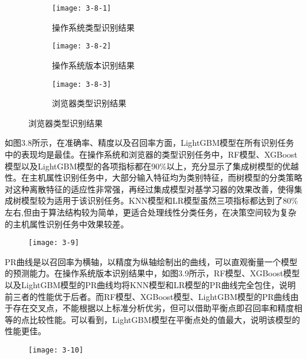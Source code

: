 \begin{figure}[!h]
    \centering
    \begin{subfigure}[b]{0.8\textwidth}
      \texttt{[image: 3-8-1]}
      \caption{操作系统类型识别结果}
    \end{subfigure}
    \begin{subfigure}[b]{0.8\textwidth}
      \texttt{[image: 3-8-2]}
      \caption{操作系统版本识别结果}
    \end{subfigure}
    \begin{subfigure}[b]{0.8\textwidth}
      \texttt{[image: 3-8-3]}
      \caption{浏览器类型识别结果}
    \end{subfigure}
    \label{fig:3-8}
\end{figure}

如图3.8所示，在准确率、精度以及召回率方面，LightGBM模型在所有识别任务中的表现均是最佳。在操作系统和浏览器的类型识别任务中，RF模型、XGBoost模型以及LightGBM模型的各项指标都在90\%以上，充分显示了集成树模型的优越性。在主机属性识别任务中，大部分输入特征均为类别特征，而树模型的分类策略对这种离散特征的适应性非常强，再经过集成模型对基学习器的效果改善，使得集成树模型较为适用于该识别任务。KNN模型和LR模型虽然三项指标都达到了80\%左右,但由于算法结构较为简单，更适合处理线性分类任务，在决策空间较为复杂的主机属性识别任务中效果较差。

\begin{figure}[!h]
    \centering
    \texttt{[image: 3-9]}
    \label{fig:3-9}
\end{figure}

PR曲线是以召回率为横轴，以精度为纵轴绘制出的曲线，可以直观衡量一个模型的预测能力。在操作系统版本识别结果中，如图3.9所示，RF模型、XGBoost模型以及LightGBM模型的PR曲线均将KNN模型和LR模型的PR曲线完全包住，说明前三者的性能优于后者。而RF模型、XGBoost模型、LightGBM模型的PR曲线由于存在交叉点，不能根据以上标准分析优劣，但可以借助平衡点即召回率和精度相等的点比较性能。可以看到，LightGBM模型在平衡点处的值最大，说明该模型的性能更佳。

\begin{figure}[!h]
    \centering
    \texttt{[image: 3-10]}
    \label{fig:3-10}
\end{figure}

